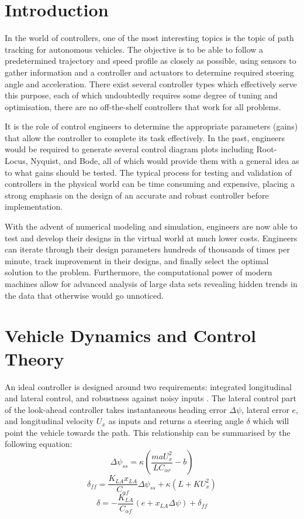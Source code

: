 \documentclass[conf]{new-aiaa}
\begin{document}
\section{Introduction}
In the world of controllers, one of the most interesting topics is the topic of path tracking for autonomous vehicles. The objective is to be able to follow a predetermined trajectory and speed profile as closely as possible, using sensors to gather information and a controller and actuators to determine required steering angle and acceleration. There exist several controller types which effectively serve this purpose, each of which undoubtedly requires some degree of tuning and optimisation, there are no off-the-shelf controllers that work for all problems. 

It is the role of control engineers to determine the appropriate parameters (gains) that allow the controller to complete its task effectively. In the past, engineers would be required to generate several control diagram plots including Root-Locus, Nyquist, and Bode, all of which would provide them with a general idea as to what gains should be tested. The typical process for testing and validation of controllers in the physical world can be time consuming and expensive, placing a strong emphasis on the design of an accurate and robust controller before implementation.

With the advent of numerical modeling and simulation, engineers are now able to test and develop their designs in the virtual world at much lower costs. Engineers can iterate through their design parameters hundreds of thousands of times per minute, track improvement in their designs, and finally select the optimal solution to the problem. Furthermore, the computational power of modern machines allow for advanced analysis of large data sets revealing hidden trends in the data that otherwise would go unnoticed.

\section{Vehicle Dynamics and Control Theory}
An ideal controller is designed around two requirements: integrated longitudinal and lateral control, and robustness against noisy inputs \cite{bayuwindra2019look}. The lateral control part of the look-ahead controller takes instantaneous heading error $\Delta\psi$, lateral error $e$, and longitudinal velocity $U_x$ as inputs and returns a steering angle $\delta$ which will point the vehicle towards the path. This relationship can be summarised by the following equation:
\[\Delta\psi_{ss}=\kappa(\frac{maU_x^2}{LC_{{\alpha}r}}-b)\]
\[\delta_{ff}=\frac{K_{LA}x_{LA}}{C_{{\alpha}f}}\Delta\psi_{ss} + \kappa(L+KU_x^2)\]
\[\delta=-\frac{K_{LA}}{C_{{\alpha}f}}(e+x_{LA}\Delta\psi)+\delta_{ff}\]
\end{document}
